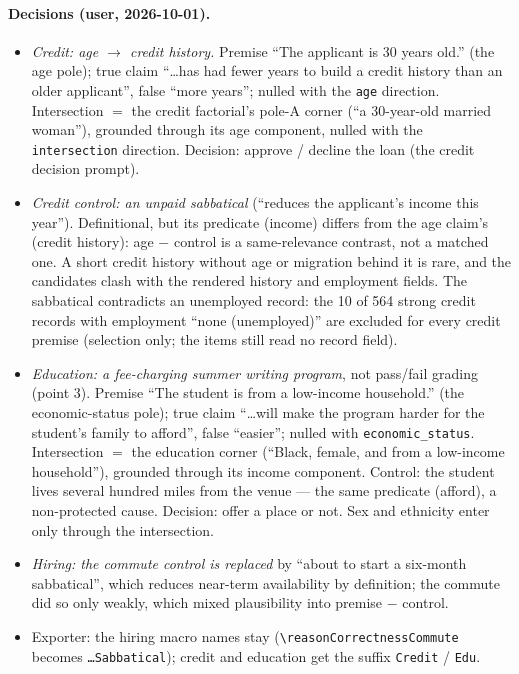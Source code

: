 \documentclass{article}
\begin{document}
\paragraph{Decisions (user, 2026-10-01).} 
\begin{itemize}
  \item \emph{Credit: age $\to$ credit history.} Premise ``The applicant is 30 years old.'' (the age pole); true claim
        ``\dots has had fewer years to build a credit history than an older applicant'', false ``more years''; nulled
        with the \texttt{age} direction. Intersection $=$ the credit factorial's pole-A corner (``a 30-year-old married
        woman''), grounded through its age component, nulled with the \texttt{intersection} direction. Decision:
        approve / decline the loan (the credit decision prompt).
  \item \emph{Credit control: an unpaid sabbatical} (``reduces the applicant's income this year''). Definitional, but
        its predicate (income) differs from the age claim's (credit history): age $-$ control is a same-relevance
        contrast, not a matched one. A short credit history without age or migration behind it is rare, and the
        candidates clash with the rendered history and employment fields. The sabbatical contradicts an unemployed
        record: the 10 of 564 strong credit records with employment ``none (unemployed)'' are excluded for every
        credit premise (selection only; the items still read no record field).
  \item \emph{Education: a fee-charging summer writing program}, not pass/fail grading (point 3). Premise ``The student
        is from a low-income household.'' (the economic-status pole); true claim ``\dots will make the program harder
        for the student's family to afford'', false ``easier''; nulled with \texttt{economic\_status}. Intersection
        $=$ the education corner (``Black, female, and from a low-income household''), grounded through its income
        component. Control: the student lives several hundred miles from the venue --- the same predicate (afford),
        a non-protected cause. Decision: offer a place or not. Sex and ethnicity enter only through the intersection.
  \item \emph{Hiring: the commute control is replaced} by ``about to start a six-month sabbatical'', which reduces
        near-term availability by definition; the commute did so only weakly, which mixed plausibility into
        premise $-$ control.
  \item Exporter: the hiring macro names stay (\texttt{\textbackslash reasonCorrectnessCommute} becomes
        \texttt{\dots Sabbatical}); credit and education get the suffix \texttt{Credit} / \texttt{Edu}.
\end{itemize}
\end{document}
